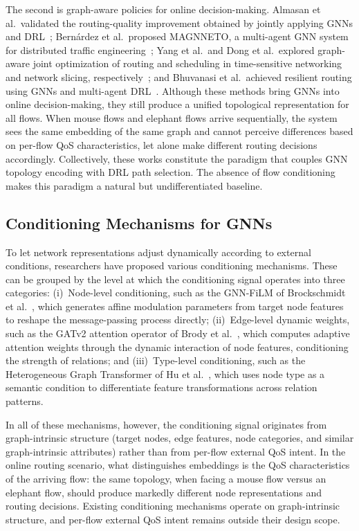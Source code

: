 The second is graph-aware policies for online decision-making. Almasan et al.\ validated the routing-quality improvement obtained by jointly applying GNNs and DRL~\cite{Almasan2022_RLmeetsGNN}; Bern\'{a}rdez et al.\ proposed MAGNNETO, a multi-agent GNN system for distributed traffic engineering~\cite{Bernardez2023_MAGNNETO_TCCN}; Yang et al.\ and Dong et al.\ explored graph-aware joint optimization of routing and scheduling in time-sensitive networking and network slicing, respectively~\cite{Yang2022_GCN_RL_IoTJ,Dong2022_GCN_Slicing_Routing_TCCN}; and Bhuvanasi et al.\ achieved resilient routing using GNNs and multi-agent DRL~\cite{Bhuvanasi2023_ResilientRouting_TNSM}. Although these methods bring GNNs into online decision-making, they still produce a unified topological representation for all flows. When mouse flows and elephant flows arrive sequentially, the system sees the same embedding of the same graph and cannot perceive differences based on per-flow QoS characteristics, let alone make different routing decisions accordingly. Collectively, these works constitute the paradigm that couples GNN topology encoding with DRL path selection. The absence of flow conditioning makes this paradigm a natural but undifferentiated baseline.

\subsection{Conditioning Mechanisms for GNNs}

To let network representations adjust dynamically according to external conditions, researchers have proposed various conditioning mechanisms. These can be grouped by the level at which the conditioning signal operates into three categories:
(i)~Node-level conditioning, such as the GNN-FiLM of Brockschmidt et al.~\cite{Brockschmidt2020_GNNFiLM}, which generates affine modulation parameters from target node features to reshape the message-passing process directly; (ii)~Edge-level dynamic weights, such as the GATv2 attention operator of Brody et al.~\cite{Brody2022_GATv2}, which computes adaptive attention weights through the dynamic interaction of node features, conditioning the strength of relations; and (iii)~Type-level conditioning, such as the Heterogeneous Graph Transformer of Hu et al.~\cite{Hu2020_HGT}, which uses node type as a semantic condition to differentiate feature transformations across relation patterns.

In all of these mechanisms, however, the conditioning signal originates from graph-intrinsic structure (target nodes, edge features, node categories, and similar graph-intrinsic attributes) rather than from per-flow external QoS intent. In the online routing scenario, what distinguishes embeddings is the QoS characteristics of the arriving flow: the same topology, when facing a mouse flow versus an elephant flow, should produce markedly different node representations and routing decisions. Existing conditioning mechanisms operate on graph-intrinsic structure, and per-flow external QoS intent remains outside their design scope.


